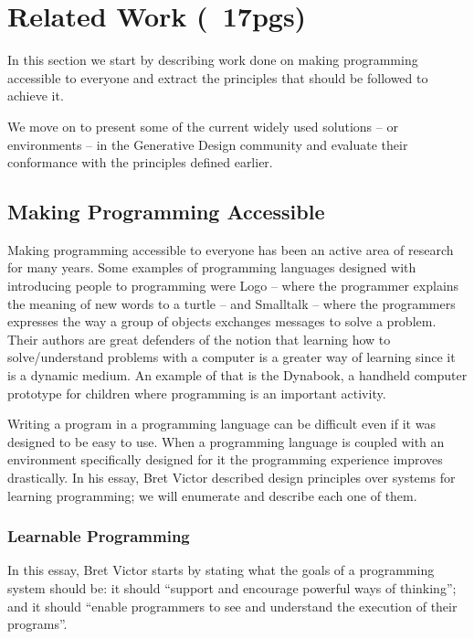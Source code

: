 \documentclass{./llncs2e/llncs}
\begin{document}
\section{Related Work (~17pgs)}
In this section we start by describing work done on making programming accessible to everyone and extract the principles that should be followed to achieve it.

We move on to present some of the current widely used solutions -- or environments -- in the Generative Design community and evaluate their conformance with the principles defined earlier.

\subsection{Making Programming Accessible}
Making programming accessible to everyone has been an active area of research for many years. Some examples of programming languages designed with introducing people to programming were Logo\cite{papert1999logo} -- where the programmer explains the meaning of new words to a turtle -- and Smalltalk\cite{goldberg1983smalltalk} -- where the programmers expresses the way a group of objects exchanges messages to solve a problem. Their authors are great defenders of the notion that learning how to solve/understand problems with a computer is a greater way of learning since it is a dynamic medium. An example of that is the Dynabook\cite{Kay:2011:PCC:800193.1971922}, a handheld computer prototype for children where programming is an important activity.

Writing a program in a programming language can be difficult even if it was designed to be easy to use. When a programming language is coupled with an environment specifically designed for it the programming experience improves drastically. In his essay\cite{victor2012learnable}, Bret Victor described design principles over systems for learning programming; we will enumerate and describe each one of them.

\subsubsection{Learnable Programming\cite{victor2012learnable}}
In this essay, Bret Victor starts by stating what the goals of a programming system should be: it should ``support and encourage powerful ways of thinking''; and it should ``enable programmers to see and understand the execution of their programs''.
\end{document}
